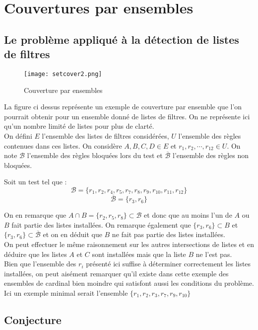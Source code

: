 \documentclass[oneside,a4paper,12pt]{article}
\begin{document}
\newpage
\appendix

\section{Couvertures par ensembles}\label{setcover}
\subsection{Le problème appliqué à la détection de listes de filtres}
\begin{figure}[h]
	\centering
	\texttt{[image: setcover2.png]}
	\caption{Couverture par ensembles}
\end{figure}

La figure ci dessus représente un exemple de couverture par ensemble que l'on pourrait obtenir pour un ensemble donné de listes de filtres. On ne représente ici qu'un nombre limité de listes pour plus de clarté.\\

On défini $E$ l'ensemble des listes de filtres considérées, $U$ l'ensemble des règles contenues dans ces listes. On considère $A, B, C, D \in E$ et $r_1, r_2, \cdots, r_{12} \in U$. On note $\mathcal{B}$ l'ensemble des règles bloquées lors du test et $\overline{\mathcal{B}}$ l'ensemble des règles non bloquées.

Soit un test tel que :
\[ \mathcal{B} = \{r_1, r_2, r_4, r_5, r_7, r_8, r_9, r_{10}, r_{11}, r_{12}\} \]
\[ \overline{\mathcal{B}} = \{r_3, r_6\} \]

On en remarque que $A \cap B = \{r_2, r_5, r_8\} \subset \mathcal{B}$ et donc que au moins l'un de $A$ ou $B$ fait partie des listes installées. On remarque également que $\{r_3, r_6\} \subset B $ et $\{r_3, r_6\} \subset \overline{\mathcal{B}} $ et on en déduit que $B$ ne fait pas partie des listes installées.\\
\newpage
On peut effectuer le même raisonnement sur les autres intersections de listes et en déduire que les listes $A$ et $C$ sont installées mais que la liste $B$ ne l'est pas.\\

Bien que l'ensemble des $r_i$ présenté ici suffise à d\'eterminer correctement les listes installées, on peut aisément remarquer qu'il existe dans cette exemple des ensembles de cardinal bien moindre qui satisfont aussi les conditions du problème. Ici un exemple minimal serait l'ensemble $\{r_1, r_2, r_3, r_7, r_9, r_{10}\}$

\subsection{Conjecture}
\end{document}
